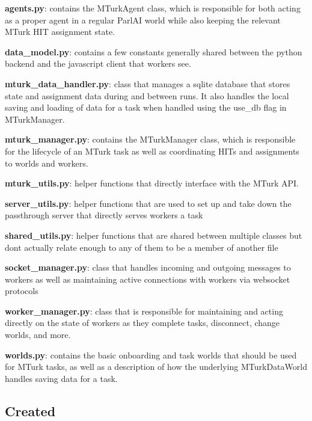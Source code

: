 \begin{DoxyItemize}
\item {\bfseries agents.\+py}\+: contains the {\ttfamily M\+Turk\+Agent} class, which is responsible for both acting as a proper agent in a regular Parl\+AI world while also keeping the relevant M\+Turk H\+IT assignment state.
\item {\bfseries data\+\_\+model.\+py}\+: contains a few constants generally shared between the python backend and the javascript client that workers see.
\item {\bfseries mturk\+\_\+data\+\_\+handler.\+py}\+: class that manages a sqlite database that stores state and assignment data during and between runs. It also handles the local saving and loading of data for a task when handled using the use\+\_\+db flag in {\ttfamily M\+Turk\+Manager}.
\item {\bfseries mturk\+\_\+manager.\+py}\+: contains the {\ttfamily M\+Turk\+Manager} class, which is responsible for the lifecycle of an M\+Turk task as well as coordinating H\+I\+Ts and assignments to worlds and workers.
\item {\bfseries mturk\+\_\+utils.\+py}\+: helper functions that directly interface with the M\+Turk A\+PI.
\item {\bfseries server\+\_\+utils.\+py}\+: helper functions that are used to set up and take down the passthrough server that directly serves workers a task
\item {\bfseries shared\+\_\+utils.\+py}\+: helper functions that are shared between multiple classes but don\textquotesingle{}t actually relate enough to any of them to be a member of another file
\item {\bfseries socket\+\_\+manager.\+py}\+: class that handles incoming and outgoing messages to workers as well as maintaining active connections with workers via websocket protocols
\item {\bfseries worker\+\_\+manager.\+py}\+: class that is responsible for maintaining and acting directly on the state of workers as they complete tasks, disconnect, change worlds, and more.
\item {\bfseries worlds.\+py}\+: contains the basic onboarding and task worlds that should be used for M\+Turk tasks, as well as a description of how the underlying {\ttfamily M\+Turk\+Data\+World} handles saving data for a task.
\end{DoxyItemize}

\subsection*{Created}

